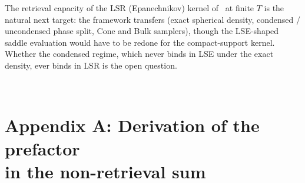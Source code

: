 \documentclass[letterpaper]{article} %
\begin{document}
The retrieval capacity of the LSR (Epanechnikov) kernel of~\citet{hoover2025dense} at finite $T$ is the natural next target: the framework transfers (exact spherical density, condensed / uncondensed phase split, Cone and Bulk samplers), though the LSE-shaped saddle evaluation would have to be redone for the compact-support kernel. Whether the condensed regime, which never binds in LSE under the exact density, ever binds in LSR is the open question.








\newpage
~

\newpage

\appendix

\section{Appendix A: Derivation of the prefactor \\in the non-retrieval sum}

\label{app:prefactor}
\end{document}

